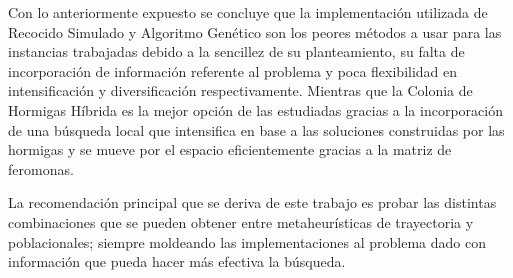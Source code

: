 \documentclass{ci5652}
\begin{document}
Con lo anteriormente expuesto se concluye que la implementación utilizada de Recocido Simulado y Algoritmo Genético son los peores métodos a usar para las instancias trabajadas debido a la sencillez de su planteamiento, su falta de incorporación de información referente al problema y poca flexibilidad en intensificación y diversificación respectivamente. Mientras que la Colonia de Hormigas Híbrida es la mejor opción de las estudiadas gracias a la incorporación de una búsqueda local que intensifica en base a las soluciones construidas por las hormigas y se mueve por el espacio eficientemente gracias a la matriz de feromonas. 

La recomendación principal que se deriva de este trabajo es probar las distintas combinaciones que se pueden obtener entre metaheurísticas de trayectoria y poblacionales; siempre moldeando las implementaciones al problema dado con información que pueda hacer más efectiva la búsqueda.


\small

\end{document}
